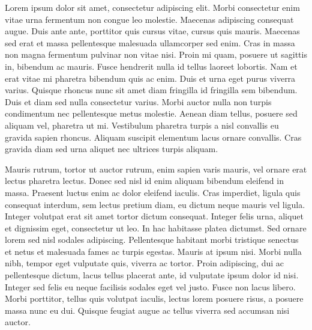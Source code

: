 
\begin{resumen} 
Lorem ipsum dolor sit amet, consectetur adipiscing elit. Morbi consectetur enim
vitae urna fermentum non congue leo molestie. Maecenas adipiscing consequat
augue. Duis ante ante, porttitor quis cursus vitae, cursus quis mauris. Maecenas
sed erat et massa pellentesque malesuada ullamcorper sed enim. Cras in massa non
magna fermentum pulvinar non vitae nisi. Proin mi quam, posuere ut sagittis in,
bibendum ac mauris. Fusce hendrerit nulla id tellus laoreet lobortis. Nam et
erat vitae mi pharetra bibendum quis ac enim. Duis et urna eget purus viverra
varius. Quisque rhoncus nunc sit amet diam fringilla id fringilla sem bibendum.
Duis et diam sed nulla consectetur varius. Morbi auctor nulla non turpis
condimentum nec pellentesque metus molestie. Aenean diam tellus, posuere sed
aliquam vel, pharetra ut mi. Vestibulum pharetra turpis a nisl convallis eu
gravida sapien rhoncus. Aliquam suscipit elementum lacus ornare convallis. Cras
gravida diam sed urna aliquet nec ultrices turpis aliquam.

Mauris rutrum, tortor ut auctor rutrum, enim sapien varis mauris, vel ornare
erat lectus pharetra lectus. Donec sed nisl id enim aliquam bibendum eleifend in
massa. Praesent luctus enim ac dolor eleifend iaculis. Cras imperdiet, ligula
quis consequat interdum, sem lectus pretium diam, eu dictum neque mauris vel
ligula. Integer volutpat erat sit amet tortor dictum consequat. Integer felis
urna, aliquet et dignissim eget, consectetur ut leo. In hac habitasse platea
dictumst. Sed ornare lorem sed nisl sodales adipiscing. Pellentesque habitant
morbi tristique senectus et netus et malesuada fames ac turpis egestas. Mauris
at ipsum nisi. Morbi nulla nibh, tempor eget vulputate quis, viverra ac tortor.
Proin adipiscing, dui ac pellentesque dictum, lacus tellus placerat ante, id
vulputate ipsum dolor id nisi. Integer sed felis eu neque facilisis sodales eget
vel justo. Fusce non lacus libero. Morbi porttitor, tellus quis volutpat
iaculis, lectus lorem posuere risus, a posuere massa nunc eu dui. Quisque
feugiat augue ac tellus viverra sed accumsan nisi auctor.
\end{resumen}
